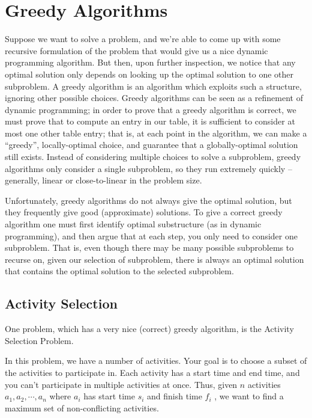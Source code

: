 \documentclass [12pt]{article}
\theoremstyle{definition}
\begin{document}
\section{Greedy Algorithms}

Suppose we want to solve a problem, and we're able to come up with some recursive formulation of the problem that would give us a nice dynamic programming algorithm. But then, upon further inspection, we notice that any optimal solution only depends on looking up the optimal solution to one other subproblem. A greedy algorithm is an algorithm which exploits such a structure, ignoring other possible choices. Greedy algorithms can be seen as a refinement of dynamic programming; in order to prove that a greedy algorithm is correct, we must prove that to compute an entry in our table, it is sufficient to consider at most one other table entry; that is, at each point in the algorithm, we can make a “greedy”, locally-optimal choice, and guarantee that a globally-optimal solution still exists. Instead of considering multiple choices to solve a subproblem, greedy algorithms only consider a single subproblem, so they run extremely quickly – generally, linear or close-to-linear in the problem size. 

Unfortunately, greedy algorithms do not always give the optimal solution, but they frequently give good (approximate) solutions. To give a correct greedy algorithm one must first identify optimal substructure (as in dynamic programming), and then argue that at each step, you only need to consider one subproblem. That is, even though there may be many possible subproblems to recurse on, given our selection of subproblem, there is always an optimal solution that contains the optimal solution to the selected subproblem.

\subsection{Activity Selection} 

One problem, which has a very nice (correct) greedy algorithm, is the Activity Selection Problem. 

In this problem, we have a number of activities. Your goal is to choose a subset of the activities to participate in. Each activity has a start time and end time, and you can't participate in multiple activities at once. Thus, given $n$ activities $a_1, a_2, \cdots, a_n$ where $a_i$ has start time $s_i$ and finish time $f_i$ , we want to find a maximum set of non-conflicting activities. 
\end{document}
